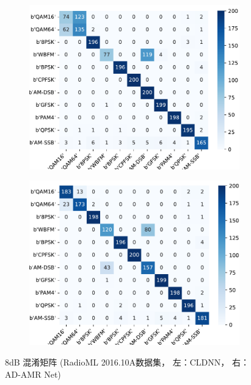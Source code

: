 \begin{figure}[ht]
    \centering
    \begin{subfigure}[b]{0.45\textwidth}
      \includegraphics[width=\textwidth]{Image/cldnn_16a.pdf}
      \label{fig:image1}
    \end{subfigure}
    \hfill
    \begin{subfigure}[b]{0.45\textwidth}
      \includegraphics[width=\textwidth]{Image/proposed_16a.pdf}
      \label{fig:image2}
    \end{subfigure}
    \caption{8dB 混淆矩阵 (RadioML 2016.10A数据集， 左：CLDNN， 右：AD-AMR Net)}
    \label{fig:16a_matrix}
  \end{figure}
  
